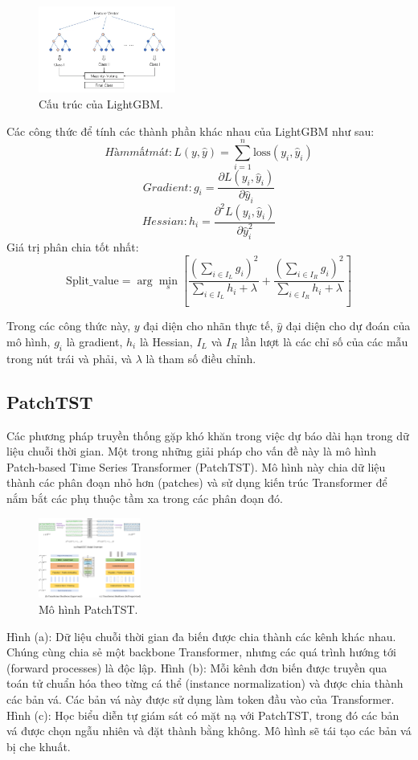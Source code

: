 \documentclass[conference]{IEEEtran}
\begin{document}
\begin{figure}[H]
    \centering
    \includegraphics[width=0.4\textwidth]{bibliography/pictures/lightgbm.png}
    \caption{Cấu trúc của LightGBM.}
\end{figure}

Các công thức để tính các thành phần khác nhau của LightGBM như sau: 
\[
Hàm mất mát: L(y, \hat{y}) = \sum_{i=1}^{n} \text{loss}(y_i, \hat{y}_i)
\]
\[
Gradient: g_i = \frac{\partial L(y_i, \hat{y}_i)}{\partial \hat{y}_i}
\]
\[
Hessian: h_i = \frac{\partial^2 L(y_i, \hat{y}_i)}{\partial \hat{y}_i^2}
\]
Giá trị phân chia tốt nhất:
\[
\text{Split\_value} = \arg\min_{s} \left[ \frac{(\sum_{i \in I_L} g_i)^2}{\sum_{i \in I_L} h_i + \lambda} + \frac{(\sum_{i \in I_R} g_i)^2}{\sum_{i \in I_R} h_i + \lambda} \right]
\]

Trong các công thức này, $y$ đại diện cho nhãn thực tế, $\hat{y}$ đại diện cho dự đoán của mô hình, $g_i$ là gradient, $h_i$ là Hessian, $I_L$ và $I_R$ lần lượt là các chỉ số của các mẫu trong nút trái và phải, và $\lambda$ là tham số điều chỉnh.
\subsection{PatchTST}
Các phương pháp truyền thống gặp khó khăn trong việc dự báo dài hạn trong dữ liệu chuỗi thời gian. Một trong những giải pháp cho vấn đề này là mô hình Patch-based Time Series Transformer (PatchTST). Mô hình này chia dữ liệu thành các phân đoạn nhỏ hơn (patches) và sử dụng kiến trúc Transformer để nắm bắt các phụ thuộc tầm xa trong các phân đoạn đó.

\begin{figure}[H]
    \centering
    \includegraphics[width=0.3\textwidth]{bibliography/pictures/modelPatchTST.png}
    \caption{Mô hình PatchTST.}
\end{figure}
Hình (a): Dữ liệu chuỗi thời gian đa biến được chia thành các kênh khác nhau. Chúng cùng chia sẻ một backbone Transformer, nhưng các quá trình hướng tới (forward processes) là độc lập.
Hình (b): Mỗi kênh đơn biến được truyền qua toán tử chuẩn hóa theo từng cá thể (instance normalization) và được chia thành các bản vá. Các bản vá này được sử dụng làm token đầu vào của Transformer.
Hình (c): Học biểu diễn tự giám sát có mặt nạ với PatchTST, trong đó các bản vá được chọn ngẫu nhiên và đặt thành bằng không. Mô hình sẽ tái tạo các bản vá bị che khuất.
\end{document}
